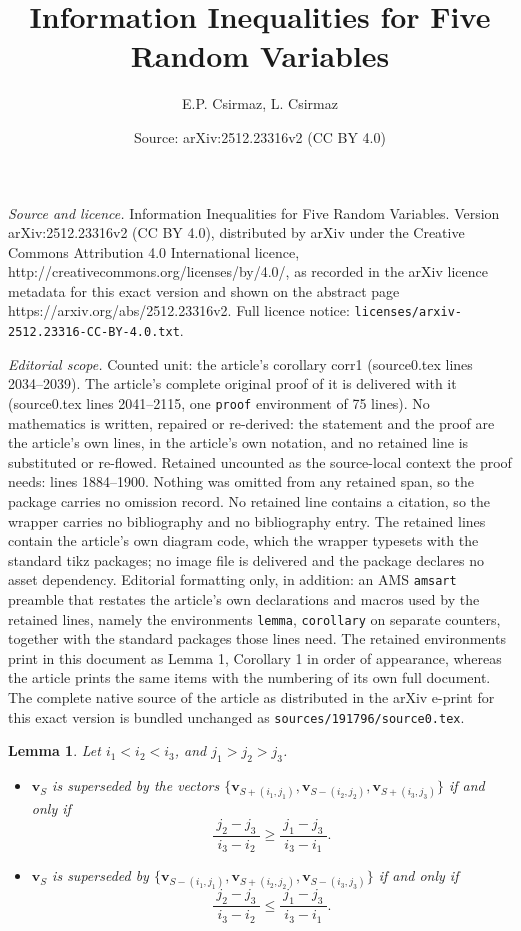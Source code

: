\documentclass[10pt,a4paper]{amsart}
\title{Information Inequalities for Five Random Variables}
\author{E.P. Csirmaz, L. Csirmaz}
\date{Source: arXiv:2512.23316v2 (CC BY 4.0)}
\newtheorem{lemma}{Lemma}
\renewcommand\ge{\geqslant}\renewcommand\le{\leqslant}
\begin{document}
\maketitle

\noindent\emph{Source and licence.} Information Inequalities for Five Random Variables. Version arXiv:2512.23316v2 (CC BY 4.0), distributed by arXiv under the Creative Commons Attribution 4.0 International licence, http://creativecommons.org/licenses/by/4.0/, as recorded in the arXiv licence metadata for this exact version and shown on the abstract page https://arxiv.org/abs/2512.23316v2. Full licence notice: \texttt{licenses/arxiv-2512.23316-CC-BY-4.0.txt}.\par\smallskip

\noindent\textit{Editorial scope.} Counted unit: the article's corollary corr1 (source0.tex lines 2034--2039). The article's complete original proof of it is delivered with it (source0.tex lines 2041--2115, one \texttt{proof} environment of 75 lines). No mathematics is written, repaired or re-derived: the statement and the proof are the article's own lines, in the article's own notation, and no retained line is substituted or re-flowed.  Retained uncounted as the source-local context the proof needs: lines 1884--1900.  Nothing was omitted from any retained span, so the package carries no omission record.  No retained line contains a citation, so the wrapper carries no bibliography and no bibliography entry.  The retained lines contain the article's own diagram code, which the wrapper typesets with the standard tikz packages; no image file is delivered and the package declares no asset dependency.  Editorial formatting only, in addition: an AMS \texttt{amsart} preamble that restates the article's own declarations and macros used by the retained lines, namely the environments \texttt{lemma}, \texttt{corollary} on separate counters, together with the standard packages those lines need.  The retained environments print in this document as Lemma 1, Corollary 1 in order of appearance, whereas the article prints the same items with the numbering of its own full document.  The complete native source of the article as distributed in the arXiv e-print for this exact version is bundled unchanged as \texttt{sources/191796/source0.tex}.
\begin{lemma}\label{lemma:convex}
Let $i_1<i_2<i_3$, and $j_1>j_2>j_3$.
\begin{itemize}
\item[(i)] $\mathbf v_S$ is
superseded by the vectors $\{\mathbf v_{S+(i_1,j_1)},
\mathbf v_{S-(i_2,j_2)}, \mathbf v_{S+(i_3,j_3)} \}$ if and only if
$$
    \frac{~j_2-j_3~}{i_3-i_2} \ge \frac{~j_1-j_3~}{i_3-i_1}.
$$
\item[(ii)] $\mathbf v_S$ is superseded by
$\{\mathbf v_{S-(i_1,j_1)}, \mathbf v_{S+(i_2,j_2)}, \mathbf
v_{S-(i_3,j_3)} \}$ if and only if
$$
    \frac{~j_2-j_3~}{i_3-i_2} \le \frac{~j_1-j_3~}{i_3-i_1}.
$$
\end{itemize}
\end{lemma}
\end{document}
